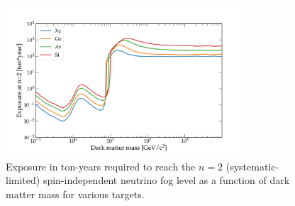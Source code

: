 \begin{figure}
    \centering
    \includegraphics[width=0.8\textwidth]{figures/exposure_at_floor_SI.pdf}
    \caption{Exposure in ton-years required to reach the $n=2$ (systematic-limited) spin-independent neutrino fog level as a function of dark matter mass for various targets. 
    \label{fig:exposure_at_floor_SI}}
\end{figure}